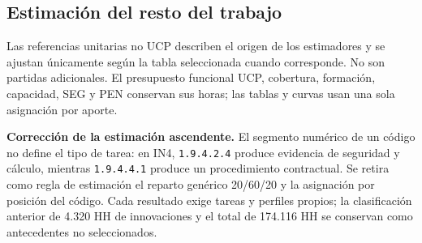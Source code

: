 \subsection{Estimación del resto del trabajo}
Las referencias unitarias no UCP describen el origen de los estimadores y se ajustan únicamente según la tabla seleccionada cuando corresponde. No son partidas adicionales. El presupuesto funcional UCP, cobertura, formación, capacidad, SEG y PEN conservan sus horas; las tablas y curvas usan una sola asignación por aporte.


\textbf{Corrección de la estimación ascendente.} El segmento numérico de un código no define el tipo de tarea: en IN4, \texttt{1.9.4.2.4} produce evidencia de seguridad y cálculo, mientras \texttt{1.9.4.4.1} produce un procedimiento contractual. Se retira como regla de estimación el reparto genérico 20/60/20 y la asignación por posición del código. Cada resultado exige tareas y perfiles propios; la clasificación anterior de 4.320 HH de innovaciones y el total de 174.116 HH se conservan como antecedentes no seleccionados.

